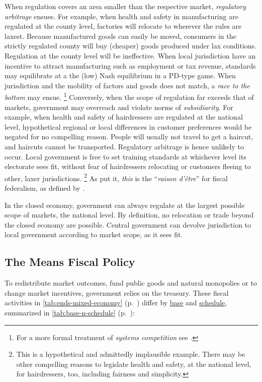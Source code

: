 \begin{description}
	When regulation covers an area smaller than the respective market, \emph{regulatory arbitrage} ensues.
For example, when health and safety in manufacturing are regulated at the county level, factories will relocate to wherever the rules are laxest.
Because manufactured goods can easily be moved, consumers in the strictly regulated county will buy (cheaper) goods produced under lax conditions.
Regulation at the county level will be ineffective.
When local jurisdiction have an incentive to attract manufacturing such as employment or tax revenue, standards may equilibrate at a the (low) Nash equilibrium in a \gls{PD}-type game.
When jurisdiction and the mobility of factors and goods does not match, a \emph{race to the bottom} may ensue.
\footnote{
	For a more formal treatment of \emph{systems competition} see \cite{Sinn2004}.
}
	Conversely, when the scope of regulation far exceeds that of markets, government may overreach and violate norms of \emph{subsidiarity}.
For example, when health and safety of hairdressers are regulated at the national level, hypothetical regional or local differences in customer preferences would be negated for no compelling reason.
People will usually not travel to get a haircut, and haircuts cannot be transported.
Regulatory arbitrage is hence unlikely to occur.
Local government is free to set training standards at whichever level its electorate sees fit, without fear of hairdressers relocating or customers fleeing to other, laxer jurisdictions.
\footnote{
	This is a hypothetical and admittedly implausible example.
	There may be other compelling reasons to legislate health and safety, at the national level, for hairdressers, too, including fairness and simplicity.
}
	As \citeauthor{Bordo2011} put it, \emph{this} is the ``\emph{raison d'\^{e}tre}'' \citeyearpar[4]{Bordo2011} for fiscal federalism, as defined by \cite{Oates1972}.

	In the closed economy, government can always regulate at the largest possible scope of markets, the national level.
By definition, no relocation or trade beyond the closed economy are possible.
Central government can devolve jurisdiction to local government according to market scope, as it sees fit.

\end{description}

\subsection[Fiscal Policy]{The Means Fiscal Policy} \label{sec:fiscal}
To redistribute market outcomes, fund public goods and natural monopolies or to change market incentives, government relies on the treasury.
These fiscal activities in \autoref{tab:ends-mixed-economy} (p.~\pageref{tab:ends-mixed-economy}) differ by \hyperref[itm:base]{base} and \hyperref[itm:schedule]{schedule}, summarized in \autoref{tab:base-n-schedule} (p.~\pageref{tab:base-n-schedule}):

